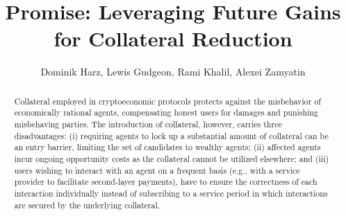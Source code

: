 \documentclass[runningheads]{llncs}
\newcommand{\sys}{Promise\xspace}
\newcommand{\dom}[1]{\todo[linecolor=green,backgroundcolor=green!25,bordercolor=green,inline,caption={}]{Comment by Dominik: #1}}
\begin{document}
\title{
\sys: Leveraging Future Gains for Collateral Reduction
} 
\author{
Dominik Harz, Lewis Gudgeon, Rami Khalil, Alexei Zamyatin
}


\date{}
\maketitle


\begin{abstract}
Collateral employed in cryptoeconomic protocols protects against the misbehavior of economically rational agents, compensating honest users for damages and punishing misbehaving parties.
The introduction of collateral, however, carries three disadvantages: (i) requiring agents to lock up a substantial amount of collateral can be an entry barrier, limiting the set of candidates to wealthy agents; (ii) affected agents incur ongoing opportunity costs as the collateral cannot be utilized elsewhere; and (iii) users wishing to interact with an agent on a frequent basis (e.g., with a service provider to facilitate second-layer payments), have to ensure the correctness of each interaction individually instead of subscribing to a service period in which interactions are secured by the underlying collateral.


\end{abstract}
\end{document}
